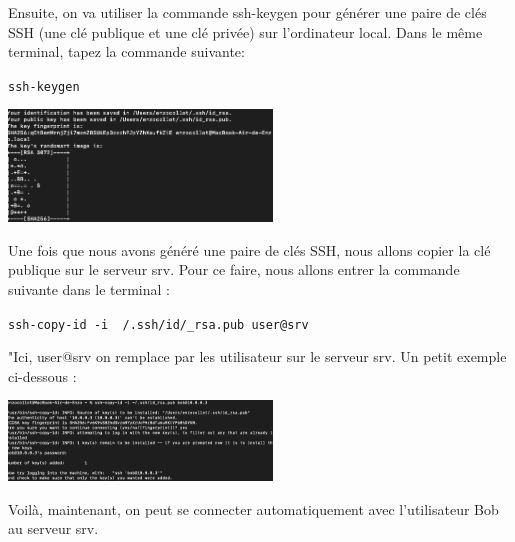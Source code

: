 \documentclass[12pt]{article}
\begin{document}
\vspace{0.3cm}

\newpage

Ensuite, on va utiliser la commande ssh-keygen pour générer une paire de clés SSH (une clé publique et une clé privée) sur l'ordinateur local. Dans le même terminal, tapez la commande suivante:

\texttt{ssh-keygen}

\vspace{0.3cm}

\begin{center}
  \includegraphics[width=7cm]{Images-Client-SSH/Image-TD-SSH-3/Génération-key.png}
\end{center}


\vspace{0.3cm}

Une fois que nous avons généré une paire de clés SSH, nous allons copier la clé publique sur le serveur srv. Pour ce faire, nous allons entrer la commande suivante dans le terminal :

\texttt{ssh-copy-id -i ~/.ssh/id/\_rsa.pub user@srv} 

\vspace{0.3cm}

"Ici, user@srv on remplace par les utilisateur sur le serveur srv. Un petit exemple ci-dessous :

\vspace{0.3cm}

\begin{center}
  \includegraphics[width=7cm]{Images-Client-SSH/Image-TD-SSH-3/ssh-copy-id.png}
\end{center}

\vspace{0.3cm}

Voilà, maintenant, on peut se connecter automatiquement avec l'utilisateur Bob au serveur srv.

\vspace{0.3cm}
\end{document}
